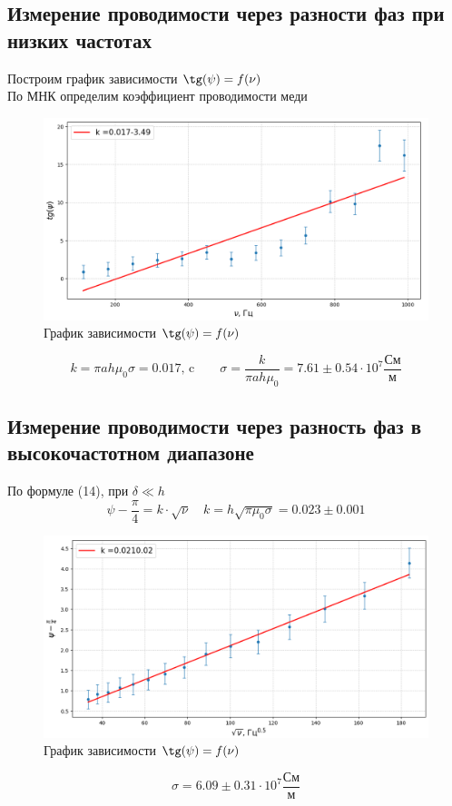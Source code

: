 \documentclass[a4paper,12pt]{article}
\begin{document}
\subsection{Измерение проводимости через разности фаз при низких частотах}
Построим график зависимости $\tg(\psi) = f(\nu)$\\ 
По МНК определим коэффициент проводимости меди
\begin{figure}[H]
    \centering
    \includegraphics[width=1\textwidth]{2_grf}
    \caption{График зависимости $\tg (\psi) = f(\nu)$}
    \label{1.2}
\end{figure}
$$
k = \pi a h \mu_0 \sigma = 0.017 \text{, c} \qquad \sigma = \dfrac{k}{\pi a h \mu_0} = 7.61 \pm 0.54 \cdot 10^7 \dfrac{\text{См}}{\text{м}}
$$

\subsection{Измерение проводимости через разность фаз в высокочастотном диапазоне}
По формуле (14), при $\delta \ll h$
$$
\psi - \dfrac{\pi}{4} = k \cdot \sqrt{\nu} \quad k = h \sqrt{\pi \mu_0 \sigma} = 0.023 \pm 0.001 
$$

\begin{figure}[H]
    \centering
    \includegraphics[width=1\textwidth]{3_grf}
    \caption{График зависимости $\tg (\psi) = f(\nu)$}
    \label{1.3}
\end{figure}
$$
\sigma = 6.09 \pm 0.31 \cdot 10^{7} \dfrac{\text{См}}{\text{м}}
$$
\end{document}
